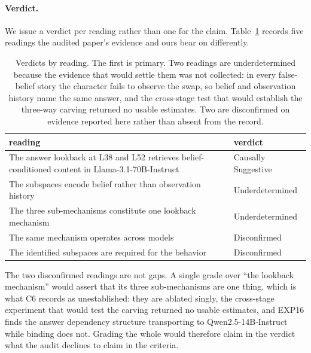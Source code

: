\documentclass{article}
\begin{document}
\paragraph{Verdict.}
We issue a verdict per reading rather than one for the claim. Table~\ref{tab:readings}
records five readings the audited paper's evidence and ours bear on differently.

\begin{table}[h]
\centering
\small
\begin{tabular}{p{7.4cm}l}
\toprule
reading & verdict \\
\midrule
The answer lookback at L38 and L52 retrieves belief-conditioned content in
Llama-3.1-70B-Instruct & Causally Suggestive \\
The subspaces encode belief rather than observation history & Underdetermined \\
The three sub-mechanisms constitute one lookback mechanism & Underdetermined \\
The same mechanism operates across models & Disconfirmed \\
The identified subspaces are required for the behavior & Disconfirmed \\
\bottomrule
\end{tabular}
\caption{Verdicts by reading. The first is primary. Two readings are underdetermined
because the evidence that would settle them was not collected: in every false-belief story
the character fails to observe the swap, so belief and observation history name the same
answer, and the cross-stage test that would establish the three-way carving returned no
usable estimates. Two are disconfirmed on evidence reported here rather than absent from
the record.}
\label{tab:readings}
\end{table}

The two disconfirmed readings are not gaps. A single grade over ``the lookback mechanism''
would assert that its three sub-mechanisms are one thing, which is what C6 records as
unestablished: they are ablated singly, the cross-stage experiment that would test the
carving returned no usable estimates, and EXP16 finds the answer dependency structure
transporting to Qwen2.5-14B-Instruct while binding does not. Grading the whole would
therefore claim in the verdict what the audit declines to claim in the criteria.
\end{document}
